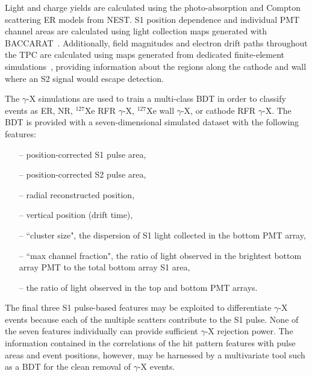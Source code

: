 \documentclass[reprint, showpacs,
preprintnumbers,
amsmath,amssymb,
aps, floatfix,
superscriptaddress,
prd, nofootinbib]{revtex4-1}
\begin{document}
Light and charge yields are calculated using the photo-absorption and Compton scattering ER models from NEST.
S1 position dependence and individual PMT channel areas are calculated using light collection maps generated with BACCARAT~\cite{LZ:simulations_2021}. 
Additionally, field magnitudes and electron drift paths throughout the TPC are calculated using maps generated from dedicated finite-element simulations~\cite{fenics}, providing information about the regions along the cathode and wall where an S2 signal would escape detection.
\par
The $\gamma$-X simulations are used to train a multi-class BDT in order to classify events as ER, NR, $^{127}$Xe RFR $\gamma$-X, $^{127}$Xe wall $\gamma$-X, or cathode RFR $\gamma$-X.
The BDT is provided with a seven-dimensional simulated dataset with the following features: 
\begin{itemize}
\vspace{-0.25cm}
    \item[--] position-corrected S1 pulse area,
    \vspace{-0.25cm}
\item[--] position-corrected S2 pulse area,
   \vspace{-0.25cm}
 \item[--] radial reconstructed position,
    \vspace{-0.25cm}
\item[--] vertical position (drift time),
    \vspace{-0.25cm}
\item[--] ``cluster size",  the dispersion of S1 light collected in the bottom PMT array,
    \vspace{-0.25cm}
\item[--] ``max channel fraction", the ratio of light observed in the brightest bottom array PMT to the total bottom array S1 area,
    \vspace{-0.25cm}
\item[--] the ratio of light observed in the top and bottom PMT arrays.
\end{itemize}
The final three S1 pulse-based features may be exploited to differentiate $\gamma$-X events because each of the multiple scatters contribute to the S1 pulse. 
None of the seven features individually can provide sufficient $\gamma$-X rejection power. 
The information contained in the correlations of the hit pattern features with pulse areas and event positions, however, may be harnessed by a multivariate tool such as a BDT for the clean removal of $\gamma$-X events.  
\end{document}
